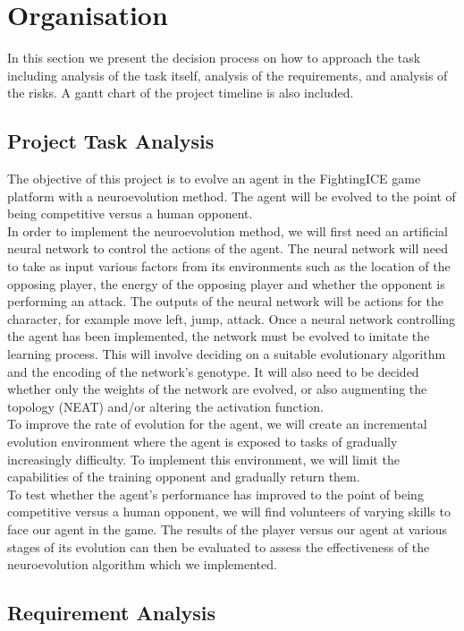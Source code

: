 \documentclass[12pt,a4paper]{article}
\begin{document}
\newpage
\section{Organisation}
In this section we present the decision process on how to approach the task including analysis of the task itself, analysis of the requirements, and analysis of the risks. A gantt chart of the project timeline is also included.
\subsection{Project Task Analysis}
The objective of this project is to evolve an agent in the FightingICE game platform with a neuroevolution method. The agent will be evolved to the point of being competitive versus a human opponent. \\

In order to implement the neuroevolution method, we will first need an artificial neural network to control the actions of the agent. The neural network will need to take as input various factors from its environments such as the location of the opposing player, the energy of the opposing player and whether the opponent is performing an attack. The outputs of the neural network will be actions for the character, for example move left, jump, attack. Once a neural network controlling the agent has been implemented, the network must be evolved to imitate the learning process. This will involve deciding on a suitable evolutionary algorithm and the encoding of the network's genotype. It will also need to be decided whether only the weights of the network are evolved, or also augmenting the topology (NEAT) and/or altering the activation function.\\

To improve the rate of evolution for the agent, we will create an incremental evolution environment where the agent is exposed to tasks of gradually increasingly difficulty. To implement this environment, we will limit the capabilities of the training opponent and gradually return them.\\

To test whether the agent's performance has improved to the point of being competitive versus a human opponent, we will find volunteers of varying skills to face our agent in the game. The results of the player versus our agent at various stages of its evolution can then be evaluated to assess the effectiveness of the neuroevolution algorithm which we implemented.
\newpage
\subsection{Requirement Analysis}
\end{document}
